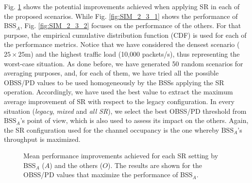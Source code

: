 \documentclass{article}
\begin{document}
Fig. \ref{fig:SIM_2_3} shows the potential improvements achieved when applying SR in each of the proposed scenarios. While Fig. \ref{fig:SIM_2_3_1} shows the performance of BSS$_A$, Fig. \ref{fig:SIM_2_3_2} focuses on the performance of the others. For that purpose, the empirical cumulative distribution function (CDF) is used for each of the performance metrics. Notice that we have considered the densest scenario ($25\times25$m) and the highest traffic load (10,000 packets/s), thus representing the worst-case situation. As done before, we have generated 50 random scenarios for averaging purposes, and, for each of them, we have tried all the possible OBSS/PD values to be used homogeneously by the BSSs applying the SR operation. Accordingly, we have used the best value to extract the maximum average improvement of SR with respect to the legacy configuration. In every situation (\emph{legacy}, \emph{mixed} and \emph{all SR}), we select the best OBSS/PD threshold from $\text{BSS}_A$'s point of view, which is also used to assess its impact on the others. Again, the SR configuration used for the channel occupancy is the one whereby $\text{BSS}_A$'s throughput is maximized.

\begin{figure}[ht!]
	\centering		
	\caption{Mean performance improvements achieved for each SR setting by BSS$_A$ ($A$) and the others ($O$). The results are shown for the OBSS/PD values that maximize the performance of BSS$_A$.}\label{fig:SIM_2_3}
\end{figure}
\end{document}
